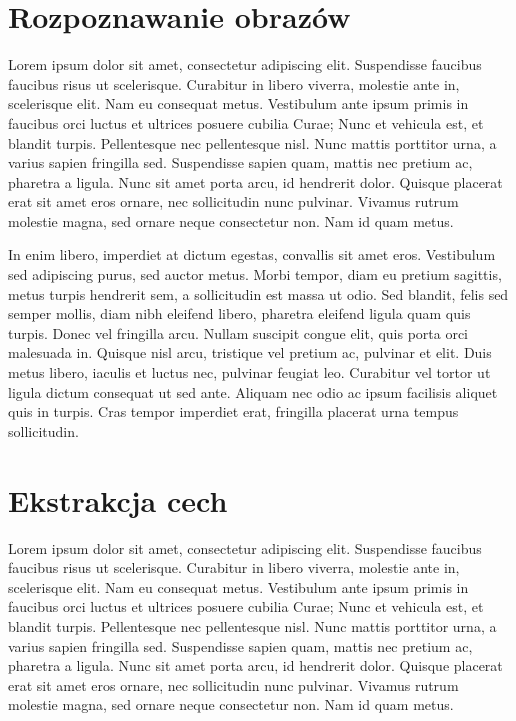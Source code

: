 
\section{Rozpoznawanie obrazów}
Lorem ipsum dolor sit amet, consectetur adipiscing elit. Suspendisse faucibus faucibus risus ut scelerisque. Curabitur in libero viverra, molestie ante in, scelerisque elit. Nam eu consequat metus. Vestibulum ante ipsum primis in faucibus orci luctus et ultrices posuere cubilia Curae; Nunc et vehicula est, et blandit turpis. Pellentesque nec pellentesque nisl. Nunc mattis porttitor urna, a varius sapien fringilla sed. Suspendisse sapien quam, mattis nec pretium ac, pharetra a ligula. Nunc sit amet porta arcu, id hendrerit dolor. Quisque placerat erat sit amet eros ornare, nec sollicitudin nunc pulvinar. Vivamus rutrum molestie magna, sed ornare neque consectetur non. Nam id quam metus.

In enim libero, imperdiet at dictum egestas, convallis sit amet eros. Vestibulum sed adipiscing purus, sed auctor metus. Morbi tempor, diam eu pretium sagittis, metus turpis hendrerit sem, a sollicitudin est massa ut odio. Sed blandit, felis sed semper mollis, diam nibh eleifend libero, pharetra eleifend ligula quam quis turpis. Donec vel fringilla arcu. Nullam suscipit congue elit, quis porta orci malesuada in. Quisque nisl arcu, tristique vel pretium ac, pulvinar et elit. Duis metus libero, iaculis et luctus nec, pulvinar feugiat leo. Curabitur vel tortor ut ligula dictum consequat ut sed ante. Aliquam nec odio ac ipsum facilisis aliquet quis in turpis. Cras tempor imperdiet erat, fringilla placerat urna tempus sollicitudin.

\section{Ekstrakcja cech}

Lorem ipsum dolor sit amet, consectetur adipiscing elit. Suspendisse faucibus faucibus risus ut scelerisque. Curabitur in libero viverra, molestie ante in, scelerisque elit. Nam eu consequat metus. Vestibulum ante ipsum primis in faucibus orci luctus et ultrices posuere cubilia Curae; Nunc et vehicula est, et blandit turpis. Pellentesque nec pellentesque nisl. Nunc mattis porttitor urna, a varius sapien fringilla sed. Suspendisse sapien quam, mattis nec pretium ac, pharetra a ligula. Nunc sit amet porta arcu, id hendrerit dolor. Quisque placerat erat sit amet eros ornare, nec sollicitudin nunc pulvinar. Vivamus rutrum molestie magna, sed ornare neque consectetur non. Nam id quam metus.

